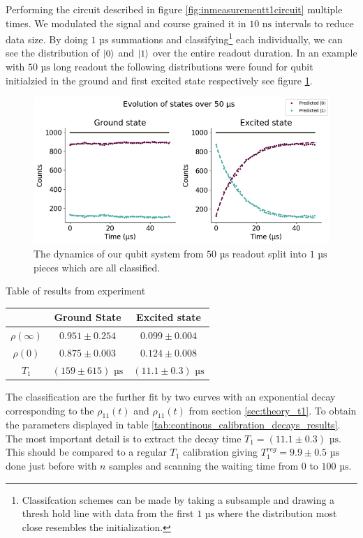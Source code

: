 Performing the circuit described in figure \ref{fig:inmeasurementt1circuit} multiple times. We modulated the signal and course grained it in $10 \text{ ns}$ intervals to reduce data size. By doing $1 \text{ µs}$ summations and classifying\footnote{Classifcation schemes can be made by taking a subsample and drawing a thresh hold line with data from the first $1 \text{ µs}$ where the distribution most close resembles the initialization.} each individually, we can see the distribution of $\ket{0}$ and $\ket{1}$ over the entire readout duration. In an example with $50 \text{ µs}$ long readout the following distributions were found for qubit initialzied in the ground and first excited state respectively see figure \ref{fig:continous_calibration_decays}. 
\begin{figure}
    \centering
    \includegraphics{Figs/calibrations/contiuous/decays.png}
    \caption{The dynamics of our qubit system from $50 \text{ µs}$ readout split into $1 \text{ µs}$ pieces which are all classified.}
    \label{fig:continous_calibration_decays}
\end{figure}
\begin{margintable}
    \centering
    \caption{Table of results from experiment}
    \begin{tabular}{c|cc}
        & Ground State & Excited state \\
        \hline
        $\rho(\infty)$&$0.951 \pm 0.254$&$0.099 \pm 0.004$ \\
        $\rho(0)$&$0.875 \pm 0.003$&$0.124 \pm 0.008$\\
        $T_1$ &$(159 \pm 615) \text{ µs}$&$(11.1 \pm 0.3)  \text{ µs}$\\
    \end{tabular}
    \label{tab:continous_calibration_decays_results}
\end{margintable}
    
The classification are the further fit by two curves with an exponential decay corresponding to the $\rho_{11}(t)$ and $\rho_{11}(t)$ from section \ref{sec:theory_t1}. To obtain the parameters displayed in table \ref{tab:continous_calibration_decays_results}. The most important detail is to extract the decay time $T_1 = (11.1\pm0.3) \text{ µs}$. This should be compared to a regular $T_1$ calibration giving $T_1^{reg} = 9.9 \pm 0.5 \text{ µs}$ done just before with $n$ samples and scanning the waiting time from $0 $ to $100 \text{ µs}$. 

